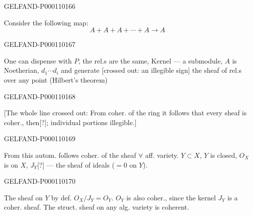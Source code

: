 \begin{GelfandAdjacentEvidence}{GELFAND-P000110}{166}



Consider the following map:
\begin{equation*}A+A+A+\cdots+A\longrightarrow A\end{equation*}
\end{GelfandAdjacentEvidence}
\begin{GelfandAdjacentEvidence}{GELFAND-P000110}{167}

One can dispense with $P$, the rel.s are the same,
Kernel — a submodule, $A$ is Noetherian, $d_1\cdots d_i$ and generate [crossed out: an illegible sign] the sheaf of rel.s over any point (Hilbert's theorem)
\end{GelfandAdjacentEvidence}
\begin{GelfandAdjacentEvidence}{GELFAND-P000110}{168}

[The whole line crossed out: From coher. of the ring it follows that every sheaf is coher., then[?]; individual portions illegible.]
\end{GelfandAdjacentEvidence}
\begin{GelfandAdjacentEvidence}{GELFAND-P000110}{169}

From this autom. follows coher. of the sheaf $\forall$ aff. variety.
$Y\subset X$, $Y$ is closed, $O_X$ is on $X$, $J_Y$[?] — the sheaf of ideals ($=0$ on $Y$).
\end{GelfandAdjacentEvidence}
\begin{GelfandAdjacentEvidence}{GELFAND-P000110}{170}

The sheaf on $Y$ by def. $O_X/J_Y=O_Y$.
$O_Y$ is also coher., since the kernel $J_Y$ is a coher. sheaf.
The struct. sheaf on any alg. variety is coherent.
\end{GelfandAdjacentEvidence}
